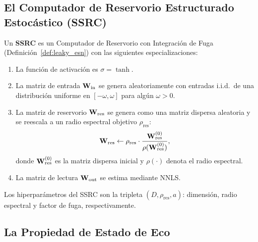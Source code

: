 \subsection{El Computador de Reservorio Estructurado Estocástico (SSRC)}
\label{subsec:ssrc_definicion}

\begin{definition}
\label{def:ssrc}
Un \textbf{SSRC} \cite{banegas2025} es un Computador de Reservorio
con Integración de Fuga
(Definición~\ref{def:leaky_esn}) con las siguientes
especializaciones:
\begin{enumerate}
    \item La función de activación es $\sigma = \tanh$.
    \item La matriz de entrada $\mathbf{W}_{\text{in}}$ se genera
    aleatoriamente con entradas i.i.d.\ de una distribución
    uniforme en $[-\omega, \omega]$ para algún $\omega > 0$.
    \item La matriz de reservorio $\mathbf{W}_{\text{res}}$ se genera
    como una matriz dispersa aleatoria y se reescala a un radio
    espectral objetivo $\rho_{\text{res}}$:
    \begin{equation}
        \mathbf{W}_{\text{res}} \leftarrow
        \rho_{\text{res}} \cdot
        \frac{\mathbf{W}_{\text{res}}^{(0)}}
        {\rho(\mathbf{W}_{\text{res}}^{(0)})},
        \label{eq:reescalado_espectral}
    \end{equation}
    donde $\mathbf{W}_{\text{res}}^{(0)}$ es la matriz dispersa
    inicial y $\rho(\cdot)$ denota el radio espectral.
    \item La matriz de lectura $\mathbf{W}_{\text{out}}$ se estima
    mediante NNLS.
\end{enumerate}
Los hiperparámetros del SSRC son la tripleta
$(D, \rho_{\text{res}}, a)$: dimensión, radio espectral y factor
de fuga, respectivamente.
\end{definition}

\subsection{La Propiedad de Estado de Eco}
\label{subsec:echo_state_property}

